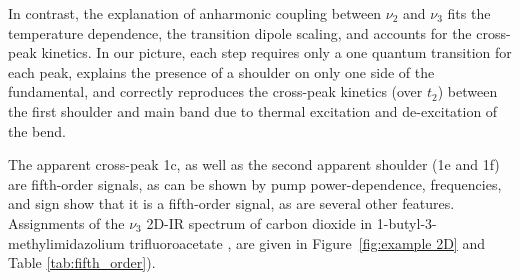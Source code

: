 {In contrast, the explanation of anharmonic coupling between \(\nu_2\) and \(\nu_3\) fits the temperature dependence, the transition dipole scaling, and accounts for the cross-peak kinetics. In our picture, each step requires only a one quantum transition for each peak, explains the presence of a shoulder on only one side of the fundamental, and correctly reproduces the cross-peak kinetics (over \(t_2\)) between the first shoulder and main band due to thermal excitation and de-excitation of the bend.

The apparent cross-peak 1c, as well as the second apparent shoulder (1e and 1f) are fifth-order signals, as can be shown by pump power-dependence, frequencies, and sign show that it is a fifth-order signal, as are several other features. Assignments of the \(\nu_3\) 2D-IR spectrum of carbon dioxide in 1-butyl-3-methylimidazolium trifluoroacetate \ce{[Im_{4,1}][TFA]}, are given in  Figure~\ref{fig:example 2D} and Table \ref{tab:fifth_order}).

}
